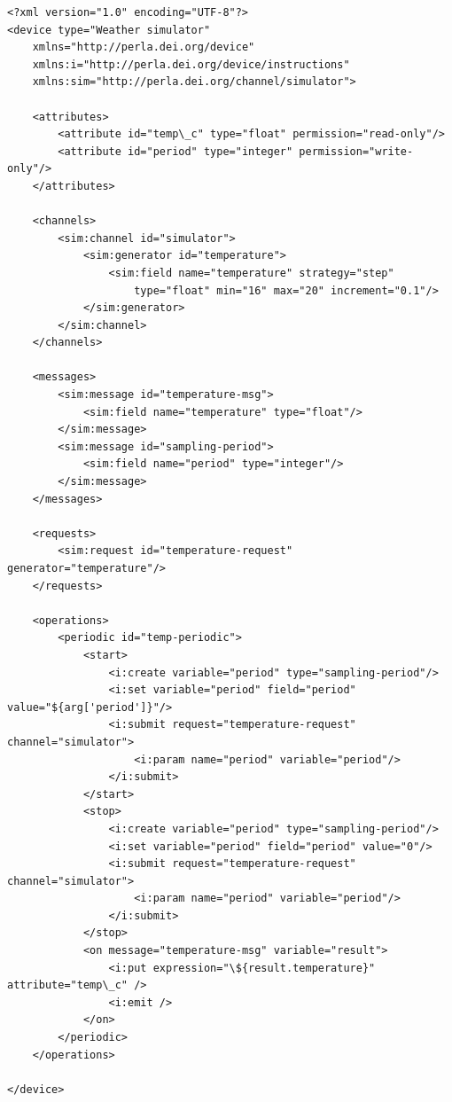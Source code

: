\lstset{language=XML}
\begin{lstlisting}
<?xml version="1.0" encoding="UTF-8"?>
<device type="Weather simulator"
    xmlns="http://perla.dei.org/device"
    xmlns:i="http://perla.dei.org/device/instructions"
    xmlns:sim="http://perla.dei.org/channel/simulator">

    <attributes>
        <attribute id="temp\_c" type="float" permission="read-only"/>
        <attribute id="period" type="integer" permission="write-only"/>
    </attributes>

    <channels>
        <sim:channel id="simulator">
            <sim:generator id="temperature">
                <sim:field name="temperature" strategy="step"
                    type="float" min="16" max="20" increment="0.1"/>
            </sim:generator>
        </sim:channel>
    </channels>

    <messages>
        <sim:message id="temperature-msg">
            <sim:field name="temperature" type="float"/>
        </sim:message>
        <sim:message id="sampling-period">
            <sim:field name="period" type="integer"/>
        </sim:message>
    </messages>

    <requests>
        <sim:request id="temperature-request" generator="temperature"/>
    </requests>

    <operations>
        <periodic id="temp-periodic">
            <start>
                <i:create variable="period" type="sampling-period"/>
                <i:set variable="period" field="period" value="${arg['period']}"/>
                <i:submit request="temperature-request" channel="simulator">
                    <i:param name="period" variable="period"/>
                </i:submit>
            </start>
            <stop>
                <i:create variable="period" type="sampling-period"/>
                <i:set variable="period" field="period" value="0"/>
                <i:submit request="temperature-request" channel="simulator">
                    <i:param name="period" variable="period"/>
                </i:submit>
            </stop>
            <on message="temperature-msg" variable="result">
                <i:put expression="\${result.temperature}" attribute="temp\_c" />
                <i:emit />
            </on>
        </periodic>
    </operations>

</device>
\end{lstlisting}



